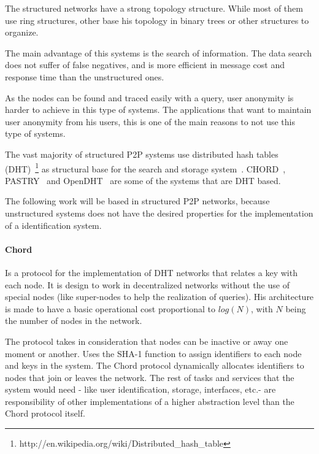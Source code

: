 The structured networks have a strong topology structure. While most of them
use ring structures, other base his topology in binary trees or other
structures to organize.

The main advantage of this systems is the search of information. The data search does not
suffer of false negatives, and is more efficient in message cost and response
time than the unstructured ones. 

As the nodes can be found and traced easily with a query, user anonymity is harder to
achieve in this type of systems.  The applications that want to maintain user
anonymity from his users, this is one of the main reasons to not use this type
of systems.

The vast majority of structured P2P systems use distributed hash tables
(DHT)~\footnote{http://en.wikipedia.org/wiki/Distributed\_hash\_table} as
structural base for the search and storage system~\cite{BalakrishnanEtAl03}.
CHORD~\cite{conf:hotos:DabekBKKMSB01},
PASTRY~\cite{oai:CiteSeerPSU:441779} and 
OpenDHT~\cite{Rhea:2005:OPD:1080091.1080102}
are some of the systems that are DHT based.

The following work will be based in structured P2P networks, because unstructured
systems does not have the desired properties for the implementation of a
identification system. 

\paragraph{Chord}
\label{sec:chord}

Is a protocol for the implementation of DHT networks that relates a key with
each node. It is design to work in decentralized networks without the use of
special nodes (like super-nodes to help the realization of queries). His
architecture is made to have a basic operational cost proportional to $log(N)$,
with $N$ being the number of nodes in the network.

The protocol takes in consideration that nodes can be inactive or away one
moment or another. Uses the SHA-1 function to assign identifiers to each node
and keys in the system. The Chord protocol dynamically allocates identifiers to nodes that
join or leaves the network. The rest of tasks and services that the system
would need - like user identification, storage, interfaces, etc.- are
responsibility of other implementations of a higher abstraction level than the
Chord protocol itself.

